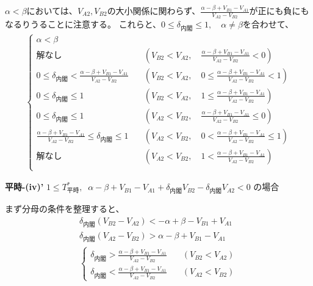 \documentclass[main.tex]{subfiles}
\begin{document}
$\alpha < \beta$においては、$V_{A2}, V_{B2}$の大小関係に関わらず、$\frac{\alpha-\beta + V_{B1}-V_{A1}}{V_{A2} - V_{B2}}$が正にも負にもなるりうることに注意する。
これらと、$0 \le \delta_{内閣} \le 1, \quad \alpha ≠ \beta$を合わせて、
\begin{align*}
\begin{cases}
    \alpha < \beta \\[1em]
    解なし \quad &( V_{B2} < V_{A2} ,\quad \frac{\alpha-\beta + V_{B1}-V_{A1}}{V_{A2} - V_{B2}} < 0 )\\[1em]
    0 \le \delta_{内閣} < \frac{\alpha-\beta + V_{B1}-V_{A1}}{V_{A2} - V_{B2}}  \quad &( V_{B2} < V_{A2} ,\quad 0 \le \frac{\alpha-\beta + V_{B1}-V_{A1}}{V_{A2} - V_{B2}} < 1) \\[1em]
    0 \le \delta_{内閣} \le 1  \quad &( V_{B2} < V_{A2} ,\quad 1 \le \frac{\alpha-\beta + V_{B1}-V_{A1}}{V_{A2} - V_{B2}}) \\[1em]
    0 \le \delta_{内閣} \le 1 \quad &( V_{A2} < V_{B2} ,\quad \frac{\alpha-\beta + V_{B1}-V_{A1}}{V_{A2} - V_{B2}} \le 0 )\\[1em]
    \frac{\alpha-\beta + V_{B1}-V_{A1}}{V_{A2} - V_{B2}} \le \delta_{内閣} \le 1  \quad &( V_{A2} < V_{B2} ,\quad 0 < \frac{\alpha-\beta + V_{B1}-V_{A1}}{V_{A2} - V_{B2}} \le 1) \\[1em]
    解なし  \quad &( V_{A2} < V_{B2} ,\quad 1 < \frac{\alpha-\beta + V_{B1}-V_{A1}}{V_{A2} - V_{B2}}) \\[1em]
\end{cases}
\end{align*}





\newpage
\textbf{平時-(iv)'}\; $1 \le T^*_{平時} ,\;\; \alpha-\beta + V_{B1}-V_{A1} + \delta_{内閣}V_{B2} - \delta_{内閣}V_{A2} < 0$ の場合


まず分母の条件を整理すると、
\begin{align*}
    \delta_{内閣}(V_{B2} - V_{A2}) < -\alpha+\beta - V_{B1}+V_{A1} \\
    \delta_{内閣}(V_{A2} - V_{B2}) > \alpha-\beta + V_{B1}-V_{A1}\\
    \begin{cases}
        \delta_{内閣} > \frac{\alpha-\beta + V_{B1}-V_{A1}}{V_{A2} - V_{B2}} \quad &(V_{B2} < V_{A2})\\[1em]
        \delta_{内閣} < \frac{\alpha-\beta + V_{B1}-V_{A1}}{V_{A2} - V_{B2}} \quad &(V_{A2} < V_{B2})
    \end{cases}
\end{align*}
\end{document}

